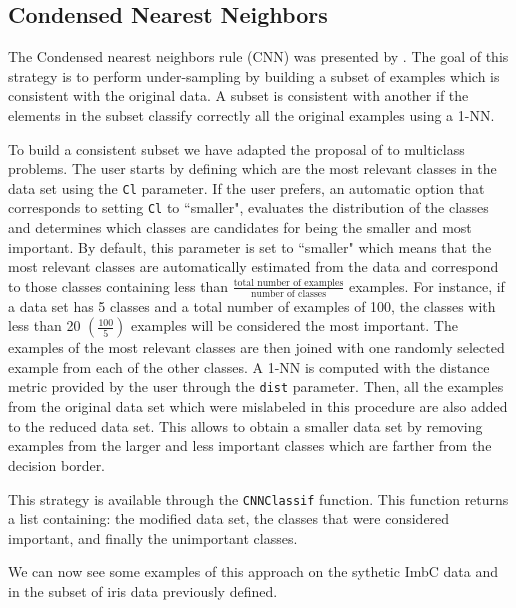 \documentclass[10pt,a4paper]{article}\usepackage[]{graphicx}\usepackage[]{color}
\begin{document}
\subsection{Condensed Nearest Neighbors}\label{sec:CNN}

The Condensed nearest neighbors rule (CNN) was presented by \cite{cnn}. The goal of this strategy is to perform under-sampling by building a subset of examples which is consistent with the original data. A subset is consistent with another if the elements in the subset classify correctly all the original examples using a 1-NN. 


To build a consistent subset we have adapted the proposal of \cite{KM97} to multiclass problems. The user starts by defining which are the most relevant classes in the data set using the \texttt{Cl} parameter. If the user prefers, an automatic option that corresponds to setting \texttt{Cl} to ``smaller", evaluates the distribution of the classes and determines which classes are candidates for being the smaller and most important. By default, this parameter is set to ``smaller" which means that the most relevant classes are automatically estimated from the data and correspond to those classes containing less than $\frac{\text{total number of examples}}{\text{number of classes}}$ examples. For instance, if a data set has 5 classes and a total number of examples of 100, the classes with less than 20 $(\frac{100}{5})$ examples will be considered the most important. The examples of the most relevant classes are then joined with one randomly selected example from each of the other classes. A 1-NN is computed with the distance metric provided by the user through the \texttt{dist} parameter. Then, all the examples from the original data set which were mislabeled in this procedure are also added to the reduced data set. This allows to obtain a smaller data set by removing examples from the larger and less important classes which are farther from the decision border.

This strategy is available through the \texttt{CNNClassif} function. This function returns a list containing: the modified data set, the classes that were considered important, and finally the unimportant classes.


We can now see some examples of this approach on the sythetic ImbC data and in the subset of iris data previously defined.
\end{document}
